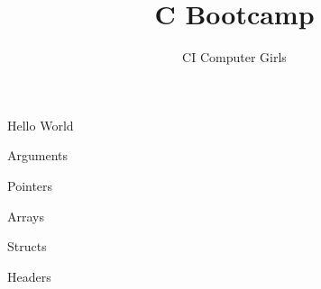 \documentclass[pdf]{beamer}
\title{C Bootcamp}
\author{CI Computer Girls}
\begin{document}
\begin{frame}
  \titlepage%
\end{frame}

\begin{frame}{Hello World}

\end{frame}

\begin{frame}{Arguments}

\end{frame}

\begin{frame}{Pointers}

\end{frame}

\begin{frame}{Arrays}

\end{frame}

\begin{frame}{Structs}

\end{frame}

\begin{frame}{Headers}

\end{frame}
\end{document}
